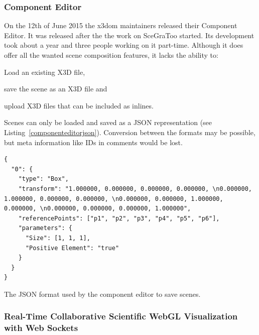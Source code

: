 \clearpage

\subsubsection{Component Editor}
\label{component-editor30}

On the 12th of June 2015 the x3dom maintainers released their Component Editor. \cite{componenteditor}
It was released after the the work on \gls{SceGraToo} started.
Its development took about a year and three people working on it part-time. \cite{componenteditoreffort}
Although it does offer all the wanted scene composition features, it lacks the ability to:

\begin{itemize*}
  \item Load an existing \gls{X3D} file,
  \item save the scene as an \gls{X3D} file and
  \item upload \gls{X3D} files that can be included as inlines.
\end{itemize*}

Scenes can only be loaded and saved as a \gls{JSON} representation (see Listing~\ref{componenteditorjson}).
Conversion between the formats may be possible, but meta information like \glspl{ID} in comments would be lost.

\begin{listing}
  \begin{verbatim}
{
  "0": {
    "type": "Box",
    "transform": "1.000000, 0.000000, 0.000000, 0.000000, \n0.000000, 1.000000, 0.000000, 0.000000, \n0.000000, 0.000000, 1.000000, 0.000000, \n0.000000, 0.000000, 0.000000, 1.000000",
    "referencePoints": ["p1", "p2", "p3", "p4", "p5", "p6"],
    "parameters": {
      "Size": [1, 1, 1],
      "Positive Element": "true"
    }
  }
}
  \end{verbatim}
  \caption{The \gls{JSON} format used by the component editor to save scenes.}
  \label{componenteditorjson}
\end{listing}

\subsubsection{Real-Time Collaborative Scientific WebGL Visualization with Web Sockets}
\label{rtcswvwws}

